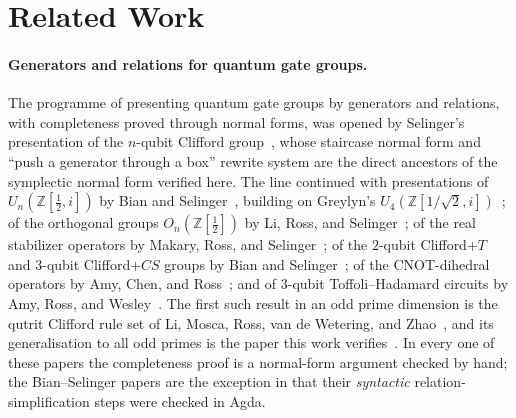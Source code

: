 \section{Related Work}\label{sec:related}

\paragraph{Generators and relations for quantum gate groups.}
The programme of presenting quantum gate groups by generators and
relations, with completeness proved through normal forms, was opened by
Selinger's presentation of the $n$-qubit Clifford
group~\cite{selinger2015clifford}, whose staircase normal form and
``push a generator through a box'' rewrite system are the direct
ancestors of the symplectic normal form verified here.  The line
continued with presentations of $U_n(\mathbb{Z}[\tfrac12,i])$ by Bian and
Selinger~\cite{bian2021un}, building on Greylyn's
$U_4(\mathbb{Z}[1/\sqrt2,i])$~\cite{greylyn2014}; of the orthogonal
groups $O_n(\mathbb{Z}[\tfrac12])$ by Li, Ross, and
Selinger~\cite{li2021on}; of the real stabilizer operators by Makary,
Ross, and Selinger~\cite{makary2021realstabilizer}; of the $2$-qubit
Clifford+$T$ and $3$-qubit Clifford+$CS$ groups by Bian and
Selinger~\cite{bian2023cliffordt2,bian2023cliffordcs3,bian2023thesis};
of the CNOT-dihedral operators by Amy, Chen, and
Ross~\cite{amy2018cnotdihedral}; and of $3$-qubit Toffoli--Hadamard
circuits by Amy, Ross, and Wesley~\cite{amy2024toffolihadamard}.  The
first such result in an odd prime dimension is the qutrit Clifford rule
set of Li, Mosca, Ross, van de Wetering, and Zhao~\cite{li2025qutrit},
and its generalisation to all odd primes is the paper this work
verifies~\cite{bian2026qudit}.  In every one of these papers the
completeness proof is a normal-form argument checked by hand; the
Bian--Selinger papers are the exception in that their \emph{syntactic}
relation-simplification steps were checked in Agda.


